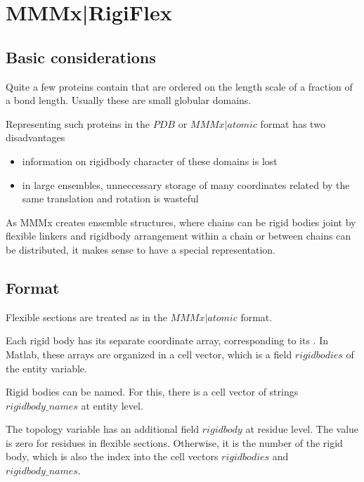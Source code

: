 \documentclass[letterpaper,10pt,english]{sphinxmanual}
\begin{document}
\chapter{MMMx|RigiFlex}
\label{\detokenize{MMMx_RigiFlex:mmmx-rigiflex}}\label{\detokenize{MMMx_RigiFlex:id1}}\label{\detokenize{MMMx_RigiFlex::doc}}

\section{Basic considerations}
\label{\detokenize{MMMx_RigiFlex:basic-considerations}}
Quite a few proteins contain  that are ordered on the length scale of a fraction of a bond length. Usually these are small globular domains.

Representing such proteins in the \(PDB\) or \(MMMx|atomic\) format has two disadvantages
\begin{itemize}
\item {} 
information on rigid\sphinxhyphen{}body character of these domains is lost

\item {} 
in large ensembles, unneccessary storage of many coordinates related by the same translation and rotation is wasteful

\end{itemize}

As MMMx creates  ensemble structures, where chains can be rigid bodies joint
by flexible linkers and rigid\sphinxhyphen{}body arrangement within a chain or between chains can be distributed, it makes sense to have a special representation.


\section{Format}
\label{\detokenize{MMMx_RigiFlex:format}}
Flexible sections are treated as in the \(MMMx|atomic\) format.

Each rigid body has its separate coordinate array, corresponding to its .
In Matlab, these arrays are organized in a cell vector, which is a field \(rigidbodies\) of the entity variable.

Rigid bodies can be named. For this, there is a cell vector of strings \(rigidbody\_names\) at entity level.

The topology variable has an additional field \(rigidbody\) at residue level. The value is zero for residues in flexible sections.
Otherwise, it is the number of the rigid body, which is also the index into the cell vectors \(rigidbodies\) and \(rigidbody\_names\).
\end{document}
